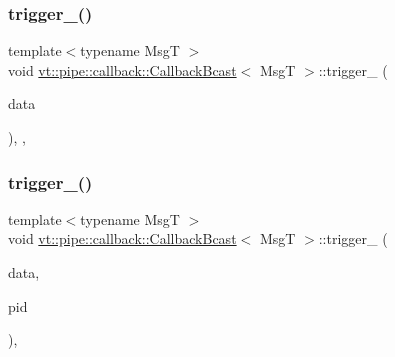 \subsubsection{\texorpdfstring{trigger\+\_\+()}{trigger\_()}\hspace{0.1cm}{\footnotesize\ttfamily [1/3]}}
{\footnotesize\ttfamily template$<$typename MsgT $>$ \\
void \hyperlink{structvt_1_1pipe_1_1callback_1_1_callback_bcast}{vt\+::pipe\+::callback\+::\+Callback\+Bcast}$<$ MsgT $>$\+::trigger\+\_\+ (\begin{DoxyParamCaption}\item[{\hyperlink{structvt_1_1pipe_1_1callback_1_1_callback_bcast_aaf994b71056001334d30d74fa9c958f9}{Signal\+Data\+Type} $\ast$}]{data }\end{DoxyParamCaption})\hspace{0.3cm}{\ttfamily [inline]}, {\ttfamily [override]}, {\ttfamily [private]}}

\mbox{\label{structvt_1_1pipe_1_1callback_1_1_callback_bcast_a8c7fea2fd47017f1cd55f249ce5111a0}} 
\subsubsection{\texorpdfstring{trigger\+\_\+()}{trigger\_()}\hspace{0.1cm}{\footnotesize\ttfamily [2/3]}}
{\footnotesize\ttfamily template$<$typename MsgT $>$ \\
void \hyperlink{structvt_1_1pipe_1_1callback_1_1_callback_bcast}{vt\+::pipe\+::callback\+::\+Callback\+Bcast}$<$ MsgT $>$\+::trigger\+\_\+ (\begin{DoxyParamCaption}\item[{\hyperlink{structvt_1_1pipe_1_1callback_1_1_callback_bcast_aaf994b71056001334d30d74fa9c958f9}{Signal\+Data\+Type} $\ast$}]{data,  }\item[{\hyperlink{namespacevt_ac9852acda74d1896f48f406cd72c7bd3}{Pipe\+Type} const \&}]{pid }\end{DoxyParamCaption})\hspace{0.3cm}{\ttfamily [override]}, {\ttfamily [private]}}

\mbox{\label{structvt_1_1pipe_1_1callback_1_1_callback_bcast_acc7d0eda09ac15644f876fdab691e269}} 
